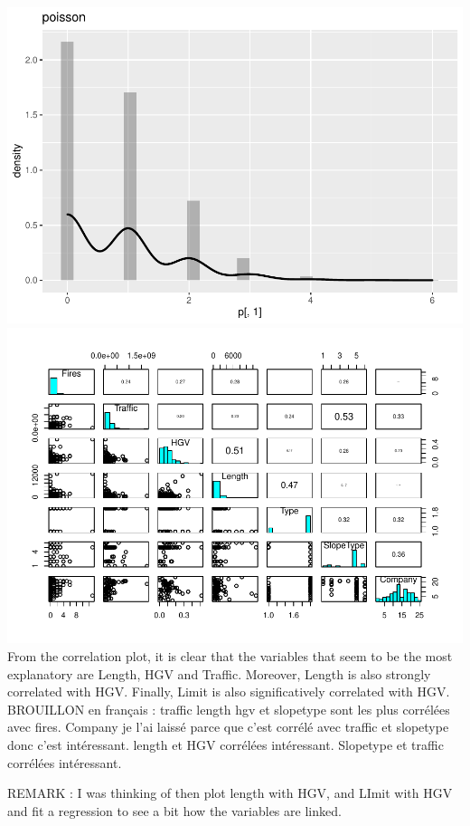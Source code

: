 \documentclass[
]{article}
\begin{document}
\includegraphics{Report_files/figure-latex/exploratory-1.pdf}
\includegraphics{Report_files/figure-latex/exploratory-2.pdf} From the
correlation plot, it is clear that the variables that seem to be the
most explanatory are Length, HGV and Traffic. Moreover, Length is also
strongly correlated with HGV. Finally, Limit is also significatively
correlated with HGV.\\

BROUILLON en français : traffic length hgv et slopetype sont les plus
corrélées avec fires. Company je l'ai laissé parce que c'est corrélé
avec traffic et slopetype donc c'est intéressant. length et HGV
corrélées intéressant. Slopetype et traffic corrélées intéressant.

REMARK : I was thinking of then plot length with HGV, and LImit with HGV
and fit a regression to see a bit how the variables are linked.\\
\end{document}
